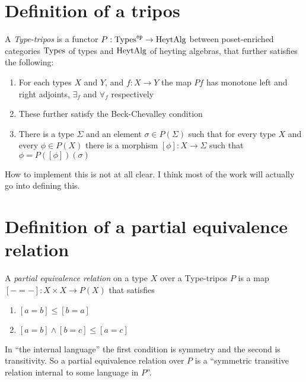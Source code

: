 \section{Definition of a tripos}

\begin{definition}
    A \emph{Type-tripos} is a functor \(P : \textrm{Types}^{\texttt{op}} \to \textrm{HeytAlg}\) between poset-enriched categories \(\textrm{Types}\) of types and \(\textrm{HeytAlg}\) of heyting algebras, that further satisfies the following:
    \begin{enumerate}
        \item For each types \(X\) and \(Y\), and \(f : X \to Y\) the map \(Pf\) has monotone left and right adjoints, \(\exists_f\) and \(\forall_f\) respectively
        \item These further satisfy the Beck-Chevalley condition
        \item There is a type \(\Sigma\) and an element \(\sigma \in P(\Sigma)\) such that for every type \(X\) and every \(\phi \in P(X)\) there is a morphism \([\phi] : X \to \Sigma\) such that \(\phi = P([\phi])(\sigma)\)
    \end{enumerate}
\end{definition}

How to implement this is not at all clear. I think most of the work will actually go into defining this.

\section{Definition of a partial equivalence relation}

\begin{definition}
    A \emph{partial equivalence relation} on a type \(X\) over a Type-tripos \(P\) is a map \([-=-]: X×X → P(X)\) that satisfies
    \begin{enumerate}
        \item \([a=b] ≤ [b=a]\)
        \item \([a=b]∧[b=c] ≤ [a=c]\)
    \end{enumerate}
\end{definition}

In ``the internal language'' the first condition is symmetry and the second is transitivity. So a partial equivalence relation over \(P\) is a ``symmetric transitive relation internal to some language in \(P\)''.

